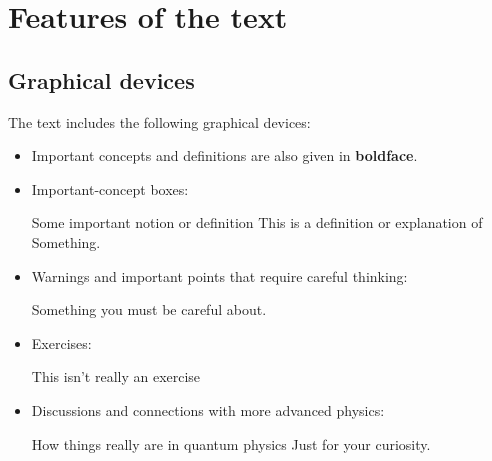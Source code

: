 \documentclass[a4paper,12pt,%
onecolumn,oneside,%
british%
]{memoir}
\renewcommand*{\|}[1][]{\nonscript\:#1\vert\nonscript\:\mathopen{}}
\newcommand*{\sect}{\S}%
\renewcommand*{\autoref}[3][\sect\,\ref]{\textcolor{blue}{#3}
\raisebox{0.6ex}{\color{blue}\miniscule%
\faIcon{angle-right}%
\;#1{#2}\;p.\,\pageref{#2}}}
\begin{document}
\section{Features of the text}
\label{sec:guide_text}

\subsection{Graphical devices}

The text includes the following graphical devices:
\begin{itemize}[para]
\item Important concepts and definitions are also given in \textbf{boldface}.

% 

\item Important-concept boxes:
  \begin{definition}{Some important notion or definition}
    This is a definition or explanation of Something.
  \end{definition}
\item Warnings and important points that require careful thinking:
  \begin{warning}[Careful!]
    Something you must be careful about.
  \end{warning}
\item Exercises:
  \begin{exercise}
    This isn't really an exercise
  \end{exercise}
\item Discussions and connections with more advanced physics:
  \begin{extra}{How things really are in quantum physics}
    Just for your curiosity.
  \end{extra}
\end{itemize}
\end{document}
